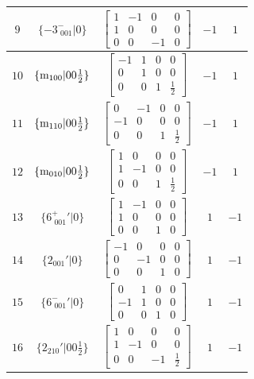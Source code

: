 \documentclass[fleqn,8pt]{jsarticle}
\begin{document}
\begin{longtable}{ccccc}
$ 9 $ & $ \{-3^{-}_{\,\,001}|0\} $ & $ \begin{bmatrix} 1 & -1 & 0 & 0 \\ 1 & 0 & 0 & 0 \\ 0 & 0 & -1 & 0 \end{bmatrix} $ & $ -1 $ & $ 1 $ \\ \hline
$ 10 $ & $ \{{\rm m}_{100}|0 0 \frac{1}{2}\} $ & $ \begin{bmatrix} -1 & 1 & 0 & 0 \\ 0 & 1 & 0 & 0 \\ 0 & 0 & 1 & \frac{1}{2} \end{bmatrix} $ & $ -1 $ & $ 1 $ \\ \hline
$ 11 $ & $ \{{\rm m}_{110}|0 0 \frac{1}{2}\} $ & $ \begin{bmatrix} 0 & -1 & 0 & 0 \\ -1 & 0 & 0 & 0 \\ 0 & 0 & 1 & \frac{1}{2} \end{bmatrix} $ & $ -1 $ & $ 1 $ \\ \hline
$ 12 $ & $ \{{\rm m}_{010}|0 0 \frac{1}{2}\} $ & $ \begin{bmatrix} 1 & 0 & 0 & 0 \\ 1 & -1 & 0 & 0 \\ 0 & 0 & 1 & \frac{1}{2} \end{bmatrix} $ & $ -1 $ & $ 1 $ \\ \hline
$ 13 $ & $ \{6^{+}_{\,\,001}{}'|0\} $ & $ \begin{bmatrix} 1 & -1 & 0 & 0 \\ 1 & 0 & 0 & 0 \\ 0 & 0 & 1 & 0 \end{bmatrix} $ & $ 1 $ & $ -1 $ \\ \hline
$ 14 $ & $ \{2{}_{001}{}'|0\} $ & $ \begin{bmatrix} -1 & 0 & 0 & 0 \\ 0 & -1 & 0 & 0 \\ 0 & 0 & 1 & 0 \end{bmatrix} $ & $ 1 $ & $ -1 $ \\ \hline
$ 15 $ & $ \{6^{-}_{\,\,001}{}'|0\} $ & $ \begin{bmatrix} 0 & 1 & 0 & 0 \\ -1 & 1 & 0 & 0 \\ 0 & 0 & 1 & 0 \end{bmatrix} $ & $ 1 $ & $ -1 $ \\ \hline
$ 16 $ & $ \{2{}_{210}{}'|0 0 \frac{1}{2}\} $ & $ \begin{bmatrix} 1 & 0 & 0 & 0 \\ 1 & -1 & 0 & 0 \\ 0 & 0 & -1 & \frac{1}{2} \end{bmatrix} $ & $ 1 $ & $ -1 $ \\ \hline

\end{longtable}
\end{document}
